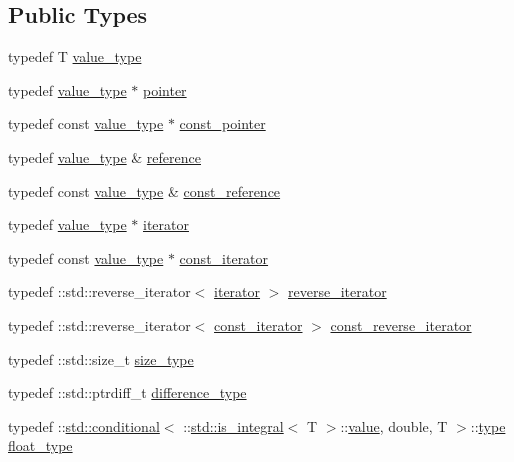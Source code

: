 \subsection*{Public Types}
\begin{DoxyCompactItemize}
\item 
typedef T \hyperlink{classtrimesh_1_1Vec_a10a59253996e42d67c713f37592669df}{value\+\_\+type}
\item 
typedef \hyperlink{classtrimesh_1_1Vec_a10a59253996e42d67c713f37592669df}{value\+\_\+type} $\ast$ \hyperlink{classtrimesh_1_1Vec_aa424b6ab52371a9b0f99f422b1aa1d26}{pointer}
\item 
typedef const \hyperlink{classtrimesh_1_1Vec_a10a59253996e42d67c713f37592669df}{value\+\_\+type} $\ast$ \hyperlink{classtrimesh_1_1Vec_ac1f9825bde0a5afde5c55e9e1052bcfd}{const\+\_\+pointer}
\item 
typedef \hyperlink{classtrimesh_1_1Vec_a10a59253996e42d67c713f37592669df}{value\+\_\+type} \& \hyperlink{classtrimesh_1_1Vec_ad76bb92c986524d251998d6eae7d2825}{reference}
\item 
typedef const \hyperlink{classtrimesh_1_1Vec_a10a59253996e42d67c713f37592669df}{value\+\_\+type} \& \hyperlink{classtrimesh_1_1Vec_a5ae45a41f93e04534f46b74dee5c6701}{const\+\_\+reference}
\item 
typedef \hyperlink{classtrimesh_1_1Vec_a10a59253996e42d67c713f37592669df}{value\+\_\+type} $\ast$ \hyperlink{classtrimesh_1_1Vec_ae21cfb5c00b53dc906ddc4f939ca8d22}{iterator}
\item 
typedef const \hyperlink{classtrimesh_1_1Vec_a10a59253996e42d67c713f37592669df}{value\+\_\+type} $\ast$ \hyperlink{classtrimesh_1_1Vec_a3bd4f0e8856d283ef56a63a106881bb9}{const\+\_\+iterator}
\item 
typedef \+::std\+::reverse\+\_\+iterator$<$ \hyperlink{classtrimesh_1_1Vec_ae21cfb5c00b53dc906ddc4f939ca8d22}{iterator} $>$ \hyperlink{classtrimesh_1_1Vec_a42a460e6f54561faf9975298d46807ec}{reverse\+\_\+iterator}
\item 
typedef \+::std\+::reverse\+\_\+iterator$<$ \hyperlink{classtrimesh_1_1Vec_a3bd4f0e8856d283ef56a63a106881bb9}{const\+\_\+iterator} $>$ \hyperlink{classtrimesh_1_1Vec_a0f78ea50431013f8f15b6286efc0dccd}{const\+\_\+reverse\+\_\+iterator}
\item 
typedef \+::std\+::size\+\_\+t \hyperlink{classtrimesh_1_1Vec_a65397e05ed96e7723cf2d54dfff0ad0a}{size\+\_\+type}
\item 
typedef \+::std\+::ptrdiff\+\_\+t \hyperlink{classtrimesh_1_1Vec_aa3601a21f245436382d7e9ffdd225e6d}{difference\+\_\+type}
\item 
typedef \+::\hyperlink{structstd_1_1conditional}{std\+::conditional}$<$ \+::\hyperlink{structstd_1_1is__integral}{std\+::is\+\_\+integral}$<$ T $>$\+::\hyperlink{namespacetrimesh_ab10cc1052c9d1d1376d92211b6ca27dd}{value}, double, T $>$\+::\hyperlink{namespacetrimesh_aa726c5bf9cff74a26269e8d258ae9e3d}{type} \hyperlink{classtrimesh_1_1Vec_a2593716457a143008832235a3e4a9155}{float\+\_\+type}
\end{DoxyCompactItemize}
